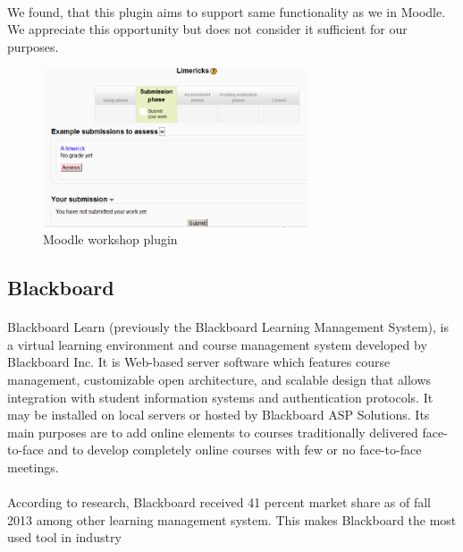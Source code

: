 \paragraph{}
We found, that this plugin aims to support same functionality as we in Moodle. We appreciate this opportunity but does not consider it sufficient for our purposes.

\begin{figure}[t]
    \centering
    \includegraphics[width=0.7\textwidth]{courses/moodleworkshop.png}
    \caption{Moodle workshop plugin}
    \label{moodle_workshop}
\end{figure}

\subsection{Blackboard}
\paragraph{}
Blackboard Learn (previously the Blackboard Learning Management System), is a virtual learning environment and course management system developed by Blackboard Inc. It is Web-based server software which features course management, customizable open architecture, and scalable design that allows integration with student information systems and authentication protocols. It may be installed on local servers or hosted by Blackboard ASP Solutions. Its main purposes are to add online elements to courses traditionally delivered face-to-face and to develop completely online courses with few or no face-to-face meetings. \cite{blackboard}

\paragraph{}
According to research, Blackboard received 41 percent market share as of fall 2013 among other learning management system. This makes Blackboard the most used tool in industry

